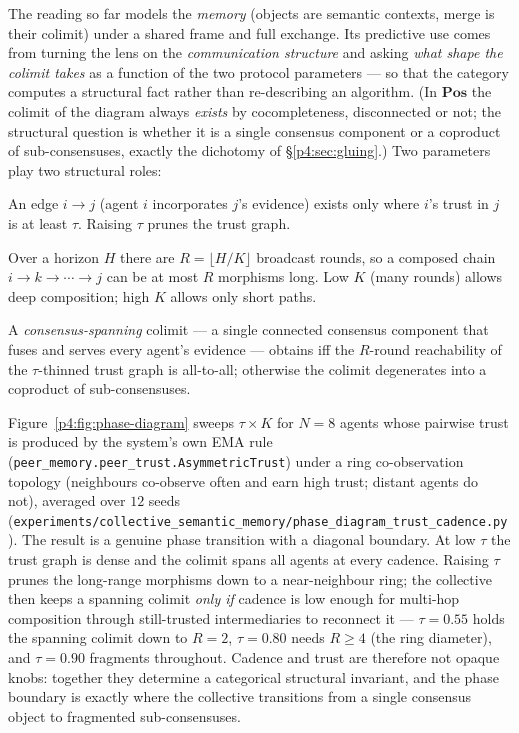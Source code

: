 \documentclass{article}
\newcommand{\method}[1]{\texttt{#1}}
\begin{document}
The reading so far models the \emph{memory} (objects are semantic contexts,
merge is their colimit) under a shared frame and full exchange. Its
predictive use comes from turning the lens on the \emph{communication
structure} and asking \emph{what shape the colimit takes} as a function of
the two protocol parameters --- so that the category computes a structural
fact rather than re-describing an algorithm. (In $\mathbf{Pos}$ the colimit
of the diagram always \emph{exists} by cocompleteness, disconnected or not;
the structural question is whether it is a single consensus component or a
coproduct of sub-consensuses, exactly the dichotomy of \S\ref{p4:sec:gluing}.) Two parameters play two structural roles:
\begin{description}[leftmargin=12pt,topsep=2pt,itemsep=1pt]
\item[Trust $\tau$ gates morphisms.] An edge $i\!\to\!j$ (agent $i$
incorporates $j$'s evidence) exists only where $i$'s trust in $j$ is at least
$\tau$. Raising $\tau$ prunes the trust graph.
\item[Cadence $K$ gates composition depth.] Over a horizon $H$ there are
$R=\lfloor H/K\rfloor$ broadcast rounds, so a composed chain
$i\!\to\!k\!\to\!\cdots\!\to\!j$ can be at most $R$ morphisms long. Low $K$
(many rounds) allows deep composition; high $K$ allows only short paths.
\end{description}
A \emph{consensus-spanning} colimit --- a single connected consensus
component that fuses and serves every agent's evidence --- obtains iff the
$R$-round reachability of the $\tau$-thinned trust graph is all-to-all;
otherwise the colimit degenerates into a coproduct of sub-consensuses.

Figure~\ref{p4:fig:phase-diagram} sweeps $\tau\times K$ for $N{=}8$ agents whose
pairwise trust is produced by the system's own EMA rule
(\method{peer\_memory.peer\_trust.AsymmetricTrust}) under a ring co-observation
topology (neighbours co-observe often and earn high trust; distant agents do
not), averaged over $12$ seeds
(\method{experiments/collective\_semantic\_memory/phase\_diagram\_trust\_cadence.py}).
The result is a genuine phase transition with a diagonal boundary. At low
$\tau$ the trust graph is dense and the colimit spans all agents at every
cadence. Raising $\tau$ prunes the long-range morphisms down to a
near-neighbour ring; the collective then keeps a spanning colimit \emph{only
if} cadence is low enough for multi-hop composition through still-trusted
intermediaries to reconnect it ---
$\tau{=}0.55$ holds the spanning colimit down to $R{=}2$, $\tau{=}0.80$ needs $R\ge4$
(the ring diameter), and $\tau{=}0.90$ fragments throughout. Cadence and trust
are therefore not opaque knobs: together they determine a categorical
structural invariant, and the phase boundary is exactly where the collective
transitions from a single consensus object to fragmented sub-consensuses.
\end{document}

